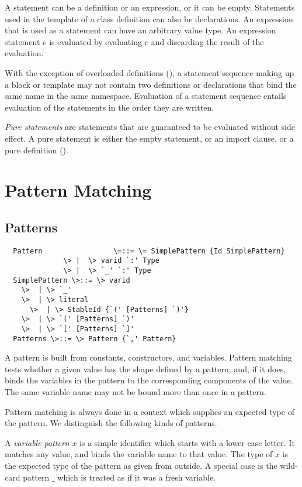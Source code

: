 \documentclass[11pt]{report}
\begin{document}
\begin{itemize}
A statement can be a definition or an expression, or it can be empty.
Statements used in the template of a class definition can also be
declarations.  An expression that is used as a statement can have an
arbitrary value type. An expression statement $e$ is evaluated by
evaluating $e$ and discarding the result of the evaluation.

With the exception of overloaded definitions
(), a statement sequence making up a block
or template may not contain two definitions or declarations that bind
the same name in the same namespace.  Evaluation of a statement
sequence entails evaluation of the statements in the order they are
written.

{\em Pure statements} are statements that are guaranteed to be
evaluated without side effect. A pure statement is either the empty
statement, or an import clause, or a pure definition ().

\chapter{Pattern Matching}

\section{Patterns}

\label{sec:patterns}

\syntax\begin{verbatim}
  Pattern                 \=::= \= SimplePattern {Id SimplePattern}
			  \> |  \> varid `:' Type
			  \> |  \> `_' `:' Type
  SimplePattern \>::= \> varid
  	\>  | \> `_'
	\>  | \> literal
      \>  | \> StableId {`(' [Patterns] `)'}
	\>  | \> `(' [Patterns] `)'
	\>  | \> `[' [Patterns] `]'
  Patterns \>::= \> Pattern {`,' Pattern}
\end{verbatim}

A pattern is built from constants, constructors, and
variables. Pattern matching tests whether a given value has the shape
defined by a pattern, and, if it does, binds the variables in the
pattern to the corresponding components of the value.  The same
variable name may not be bound more than once in a pattern.

Pattern matching is always done in a context which supplies an
expected type of the pattern. We distinguish the following kinds of patterns.

A {\em variable pattern} $x$ is a simple identifier which starts with
a lower case letter.  It matches any value, and binds the variable
name to that value.  The type of $x$ is the expected type of the
pattern as given from outside.  A special case is the wild-card
pattern $\_$ which is treated as if it was a fresh variable.


\end{itemize}
\end{document}
